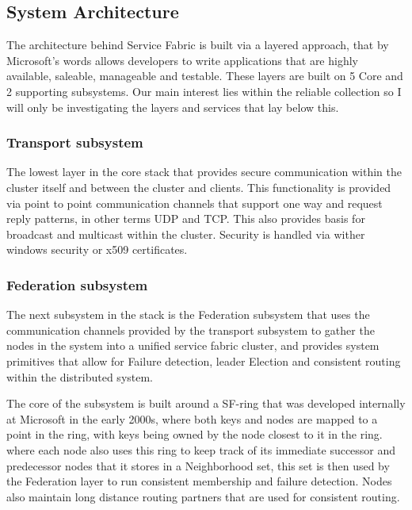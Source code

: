 \documentclass[a4paper,10pt,titlepage]{report}
\begin{document}
    \subsection{System Architecture}

    The architecture behind Service Fabric is built via a layered approach, that by Microsoft's words allows developers to write applications that are highly available, saleable, manageable and testable. These layers are built on 5 Core and 2 supporting subsystems. Our main interest lies within the reliable collection so I will only be investigating the layers and services that lay below this.\\
    \vspace{5mm}

    \subsubsection{Transport subsystem}
    The lowest layer in the core stack that provides secure communication within the cluster itself and between the cluster and clients. This functionality is provided via point to point communication channels that support one way and request reply patterns, in other terms UDP and TCP. This also provides basis for broadcast and multicast within the cluster. Security is handled via wither windows security or x509 certificates. \\
    \vspace{5mm}

    \subsubsection{Federation subsystem}

    The next subsystem in the stack is the Federation subsystem that uses the communication channels provided by the transport subsystem to gather the nodes in the system into a unified service fabric cluster, and provides system primitives that allow for Failure detection, leader Election and consistent routing within the distributed system.\\
    \vspace{5mm}

    The core of the subsystem is built around a SF-ring that was developed internally at Microsoft in the early 2000s, where both keys and nodes are mapped to a point in the ring, with keys being owned by the node closest to it in the ring. where each node also uses this ring to keep track of its immediate successor and predecessor nodes that it stores in a Neighborhood set, this set is then used by the Federation layer to run consistent membership and failure detection. Nodes also maintain long distance routing partners that are used for consistent routing.\\
    \vspace{5mm}
\end{document}
